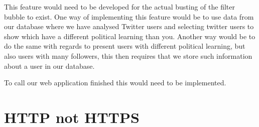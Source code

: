 This feature would need to be developed for the actual busting of the filter
bubble to exist. One way of implementing this feature would be to use data from
our database where we have analysed Twitter users and selecting twitter users to
show which have a different political learning than you. Another way would be to
do the same with regards to present users with different political learning, but
also users with many followers, this then requires that we store such
information about a user in our database.\nl

To call our web application finished this would need to be implemented.
\section{HTTP not HTTPS}
